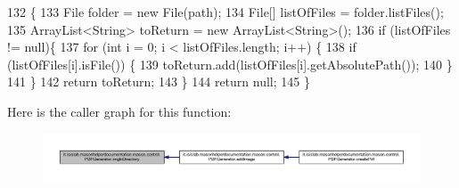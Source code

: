 \begin{DoxyCode}
132                                                          \{
133         File folder = \textcolor{keyword}{new} File(path);
134         File[] listOfFiles = folder.listFiles();
135         ArrayList<String> toReturn = \textcolor{keyword}{new} ArrayList<String>();
136         \textcolor{keywordflow}{if} (listOfFiles != null)\{
137             \textcolor{keywordflow}{for} (\textcolor{keywordtype}{int} i = 0; i < listOfFiles.length; i++) \{
138               \textcolor{keywordflow}{if} (listOfFiles[i].isFile()) \{
139                 toReturn.add(listOfFiles[i].getAbsolutePath());
140               \}
141             \}
142             \textcolor{keywordflow}{return} toReturn;
143         \}
144         \textcolor{keywordflow}{return} null;
145     \}
\end{DoxyCode}


Here is the caller graph for this function\-:
\nopagebreak
\begin{figure}[H]
\begin{center}
\leavevmode
\includegraphics[width=350pt]{classit_1_1isislab_1_1masonhelperdocumentation_1_1mason_1_1control_1_1_p_d_f_generator_a9fa1dfe581da4d09e9c7bee1a8b12972_icgraph}
\end{center}
\end{figure}





